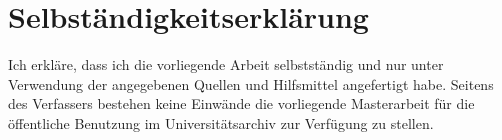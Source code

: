 \chapter{Selbständigkeitserklärung}
Ich erkläre, dass ich die vorliegende Arbeit selbstständig und nur unter Verwendung der angegebenen Quellen und Hilfsmittel angefertigt habe.
Seitens des Verfassers bestehen keine Einwände die vorliegende Masterarbeit für die öffentliche Benutzung im Universitätsarchiv zur Verfügung zu stellen.
